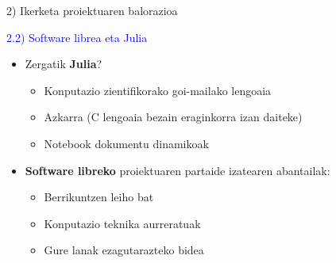 \documentclass[
 10pt,%
 compress,%
 t,       %
 xcolor=svgnames
]{beamer}
\theoremstyle{definition} \newtheorem{definicion}{Definicion}[section]
\theoremstyle{propiedades} \newtheorem{propiedades}{Propiedades}[section]
\begin{document}
\begin{frame}{2) Ikerketa proiektuaren balorazioa} 	


%

\textcolor{blue}{2.2) Software librea eta Julia}

\medskip
\begin{itemize}

\medskip
%

\item Zergatik \textbf{Julia}?
%
\medskip
\begin{itemize}
	
	\item Konputazio zientifikorako goi-mailako  lengoaia
	
	
	\medskip
	\item Azkarra (C lengoaia bezain eraginkorra izan daiteke) 
	
		\medskip
	\item Notebook dokumentu dinamikoak 
	
\end{itemize}

\bigskip

\item \textbf{Software libreko} proiektuaren partaide izatearen abantailak:

\medskip

\begin{itemize}

    \item Berrikuntzen leiho bat %
    	
	\medskip
	\item Konputazio teknika aurreratuak
	\medskip
	\item Gure lanak ezagutarazteko bidea   
	

\end{itemize}
\end{itemize}
\end{frame}
\end{document}
